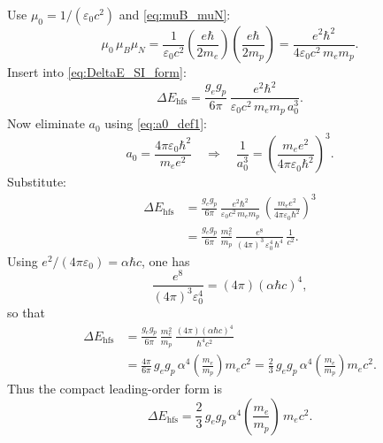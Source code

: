 \documentclass[11pt,a4paper]{article}
\begin{document}
        Use $\mu_0=1/(\varepsilon_0 c^2)$ and \eqref{eq:muB_muN}:
        \begin{equation}
            \mu_0\,\mu_B\mu_N
            =
            \frac{1}{\varepsilon_0 c^2}\left(\frac{e\hbar}{2m_e}\right)\left(\frac{e\hbar}{2m_p}\right)
            =
            \frac{e^2\hbar^2}{4\varepsilon_0 c^2\,m_e m_p}.
        \end{equation}
        Insert into \eqref{eq:DeltaE_SI_form}:
        \begin{equation}
            \Delta E_{\mathrm{hfs}}
            =
            \frac{g_e g_p}{6\pi}\,
            \frac{e^2\hbar^2}{\varepsilon_0 c^2\,m_e m_p\,a_0^3}.
            \label{eq:DeltaE_mid}
        \end{equation}
        Now eliminate $a_0$ using \eqref{eq:a0_def1}:
        \[
            a_0=\frac{4\pi\varepsilon_0\hbar^2}{m_e e^2}
            \quad\Longrightarrow\quad
            \frac{1}{a_0^3}=\left(\frac{m_e e^2}{4\pi\varepsilon_0\hbar^2}\right)^3.
        \]
        Substitute:
        \begin{align}
            \Delta E_{\mathrm{hfs}}
            &=
            \frac{g_e g_p}{6\pi}\,
            \frac{e^2\hbar^2}{\varepsilon_0 c^2\,m_e m_p}\,
            \left(\frac{m_e e^2}{4\pi\varepsilon_0\hbar^2}\right)^3
            \nonumber\\
            &=
            \frac{g_e g_p}{6\pi}\,
            \frac{m_e^2}{m_p}\,
            \frac{e^8}{(4\pi)^3\,\varepsilon_0^4\,\hbar^4}\,
            \frac{1}{c^2}.
            \label{eq:DeltaE_expand}
        \end{align}
        Using $e^2/(4\pi\varepsilon_0)=\alpha\hbar c$, one has
        \[
            \frac{e^8}{(4\pi)^3\varepsilon_0^4}
            =
            (4\pi)(\alpha\hbar c)^4,
        \]
        so that
        \begin{align}
            \Delta E_{\mathrm{hfs}}
            &=
            \frac{g_e g_p}{6\pi}\,
            \frac{m_e^2}{m_p}\,
            \frac{(4\pi)(\alpha\hbar c)^4}{\hbar^4 c^2}
            \nonumber\\
            &=
            \frac{4\pi}{6\pi}\,g_e g_p\,\alpha^4\left(\frac{m_e}{m_p}\right)m_e c^2
            =
            \frac{2}{3}\,g_e g_p\,\alpha^4\left(\frac{m_e}{m_p}\right)m_e c^2.
        \end{align}
        Thus the compact leading-order form is
        \begin{equation}
            \boxed{
                \Delta E_{\mathrm{hfs}}
                =
                \frac{2}{3}\,g_e g_p\,\alpha^4\left(\frac{m_e}{m_p}\right)\,m_e c^2.
            }
            \label{eq:DeltaE_alpha4}
        \end{equation}
        
\end{document}
